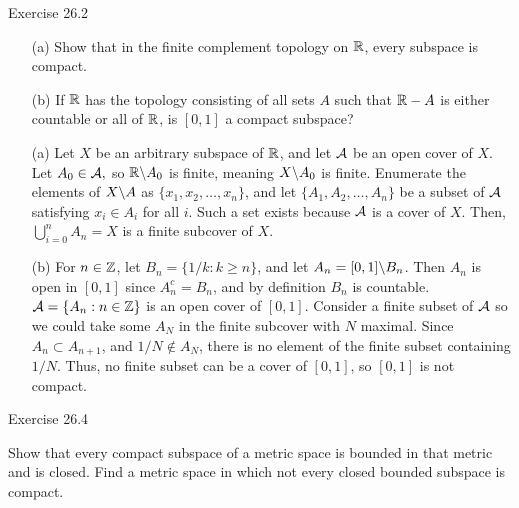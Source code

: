 \documentclass{hmwk}
\begin{document}
\maketitle

\begin{problem}{Exercise 26.2}
    \begin{itemize}
        \item[(a)] Show that in the finite complement topology on $\mathbb{R}$, every subspace is compact.
        \item[(b)] If $\mathbb{R}$ has the topology consisting of all sets $A$ such that $\mathbb{R} - A$ is either countable or all of $\mathbb{R}$, is $[0, 1]$ a compact subspace?
    \end{itemize}
\end{problem}

\begin{solution}
\begin{itemize}
        \item[(a)] Let $X$ be an arbitrary subspace of $\mathbb{R}$, and let $\mathcal{A}$ be an open cover of $X$. Let $A_0 \in \mathcal{A},$ so $\mathbb{R}\backslash A_0$ is finite, meaning $X\backslash A_0$ is finite. Enumerate the elements of $X\backslash A$ as $\{x_1, x_2, \dots, x_n\}$, and let $\{A_1, A_2, \dots, A_n\}$ be a subset of $\mathcal{A}$ satisfying $x_i \in A_i$ for all $i$. Such a set exists because $\mathcal{A}$ is a cover of $X$. Then, $\bigcup_{i=0}^n A_n = X$ is a finite subcover of $X$. 

        \item[(b)] For $n \in \mathbb{Z}$, let $B_n = \{1/k : k \geq n\}$, and let $A_n = [0, 1]\backslash B_n$. Then $A_n$ is open in $[0, 1]$ since $A_n^c = B_n$, and by definition $B_n$ is countable. $\mathcal{A} = \{A_n : n \in \mathbb{Z}\}$ is an open cover of $[0, 1]$. Consider a finite subset of $\mathcal{A}$ so we could take some $A_N$ in the finite subcover with $N$ maximal. Since $A_n \subset A_{n+1}$, and $1/N \notin A_N$, there is no element of the finite subset containing $1/N$. Thus, no finite subset can be a cover of $[0, 1]$, so $[0, 1]$ is not compact. 
    \end{itemize}
\end{solution}

\begin{problem}{Exercise 26.4}

    \pre Show that every compact subspace of a metric space is bounded in that metric and is closed. Find a metric space in which not every closed bounded subspace is compact.
\end{problem}
\end{document}

